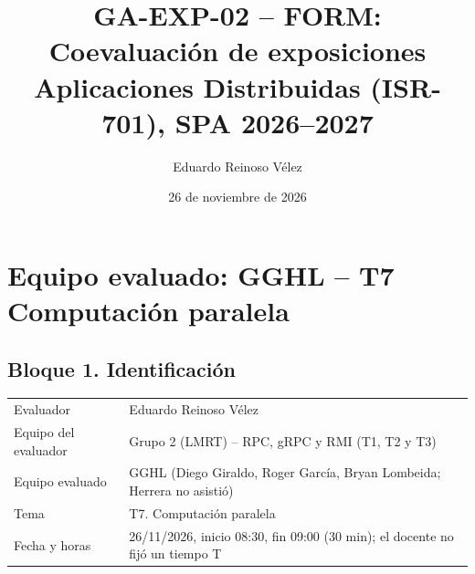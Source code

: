 \documentclass[11pt,a4paper]{article}
\title{GA-EXP-02 -- FORM: Coevaluación de exposiciones\\
\large Aplicaciones Distribuidas (ISR-701), SPA 2026--2027}
\author{Eduardo Reinoso Vélez}
\date{26 de noviembre de 2026}
\begin{document}
\maketitle

\section{Equipo evaluado: GGHL -- T7 Computación paralela}

\subsection*{Bloque 1. Identificación}
\begin{tabular}{@{}p{4.2cm}p{11cm}@{}}
Evaluador & Eduardo Reinoso Vélez \\
Equipo del evaluador & Grupo 2 (LMRT) -- RPC, gRPC y RMI (T1, T2 y T3) \\
Equipo evaluado & GGHL (Diego Giraldo, Roger García, Bryan Lombeida; Herrera no asistió) \\
Tema & T7. Computación paralela \\
Fecha y horas & 26/11/2026, inicio 08:30, fin 09:00 (30 min); el docente no fijó un tiempo T \\
\end{tabular}
\end{document}
